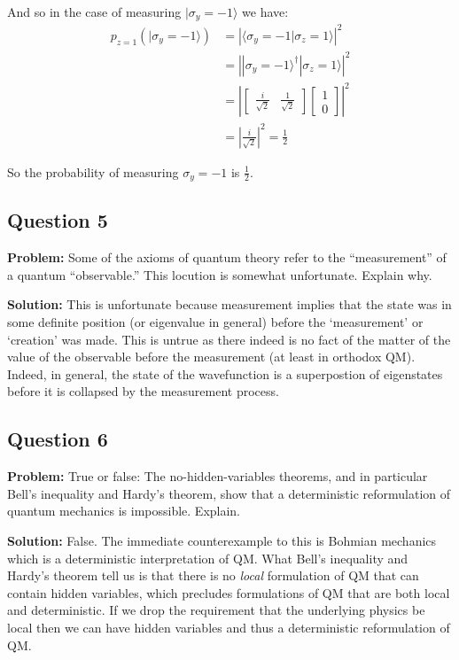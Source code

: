 \documentclass{article}
\begin{document}
And so in the case of measuring $|\sigma_y=-1\rangle$ we have:
\begin{align*}
    p_{z=1}(|\sigma_y=-1\rangle)&=\left|\langle\sigma_y=-1|\sigma_z=1\rangle\right|^2\\
    &=\left||\sigma_y=-1\rangle^\dagger|\sigma_z=1\rangle\right|^2\\
    &=\left|\begin{bmatrix}
        \frac{i}{\sqrt{2}}&\frac{1}{\sqrt{2}}
    \end{bmatrix}\begin{bmatrix}
        1\\0
    \end{bmatrix}\right|^2\\
    &=\left|\frac{i}{\sqrt{2}}\right|^2=\frac{1}{2}
\end{align*}

So the probability of measuring $\sigma_y=-1$ is $\frac{1}{2}$.

\subsection*{Question 5}
\noindent\textbf{Problem:} Some of the axioms of quantum theory refer to the ``measurement'' of a quantum ``observable.'' This locution is somewhat unfortunate. Explain why.
\bigskip

\noindent\textbf{Solution:} This is unfortunate because measurement implies that the state was in some definite position (or eigenvalue in general) before the `measurement' or `creation' was made. This is untrue as there indeed is no fact of the matter of the value of the observable before the measurement (at least in orthodox QM). Indeed, in general, the state of the wavefunction is a superpostion of eigenstates before it is collapsed by the measurement process.

\subsection*{Question 6}
\noindent\textbf{Problem:} True or false: The no-hidden-variables theorems, and in particular Bell's inequality and Hardy's theorem, show that a deterministic reformulation of quantum mechanics is impossible. Explain.
\bigskip

\noindent\textbf{Solution:} False. The immediate counterexample to this is Bohmian mechanics which is a deterministic interpretation of QM. What Bell's inequality and Hardy's theorem tell us is that there is no \textit{local} formulation of QM that can contain hidden variables, which precludes formulations of QM that are both local and deterministic. If we drop the requirement that the underlying physics be local then we can have hidden variables and thus a deterministic reformulation of QM.
\end{document}
